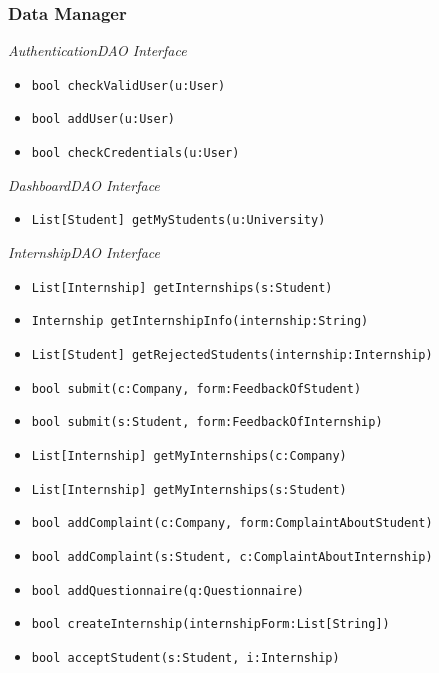 \documentclass{article}
\begin{document}
\subsubsection{Data Manager}
\textit{AuthenticationDAO Interface}
\begin{itemize}
    \item \texttt{bool checkValidUser(u:User)}
    \item \texttt{bool addUser(u:User)}
    \item \texttt{bool checkCredentials(u:User)}
\end{itemize}

\begin{flushleft}
    \textit{DashboardDAO Interface}   
\end{flushleft}

\begin{itemize}
    \item \texttt{List[Student] getMyStudents(u:University)}
\end{itemize}

\newpage

\begin{flushleft}
    \textit{InternshipDAO Interface}
\end{flushleft}

\begin{itemize}
    \item \texttt{List[Internship] getInternships(s:Student)}
    \item \texttt{Internship getInternshipInfo(internship:String)}
    \item \texttt{List[Student] getRejectedStudents(internship:Internship)}
    \item \texttt{bool submit(c:Company, form:FeedbackOfStudent)}
    \item \texttt{bool submit(s:Student, form:FeedbackOfInternship)}
    \item \texttt{List[Internship] getMyInternships(c:Company)}
    \item \texttt{List[Internship] getMyInternships(s:Student)}
    \item \texttt{bool addComplaint(c:Company, form:ComplaintAboutStudent)}
    \item \texttt{bool addComplaint(s:Student, c:ComplaintAboutInternship)}
    \item \texttt{bool addQuestionnaire(q:Questionnaire)}
    \item \texttt{bool createInternship(internshipForm:List[String])}
    \item \texttt{bool acceptStudent(s:Student, i:Internship)}
\end{itemize}
\end{document}
